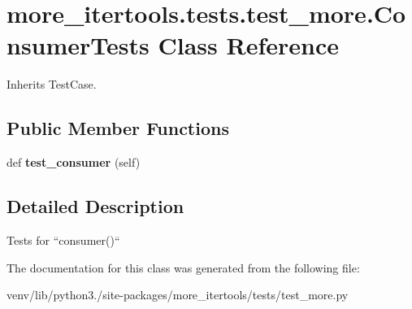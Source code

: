 \hypertarget{classmore__itertools_1_1tests_1_1test__more_1_1_consumer_tests}{}\section{more\+\_\+itertools.\+tests.\+test\+\_\+more.\+Consumer\+Tests Class Reference}
\label{classmore__itertools_1_1tests_1_1test__more_1_1_consumer_tests}


Inherits Test\+Case.

\subsection*{Public Member Functions}
\begin{DoxyCompactItemize}
\item 
\mbox{\label{classmore__itertools_1_1tests_1_1test__more_1_1_consumer_tests_a8c184f40754d63bd7e470deb3bcdfda5}} 
def {\bfseries test\+\_\+consumer} (self)
\end{DoxyCompactItemize}


\subsection{Detailed Description}
\begin{DoxyVerb}Tests for ``consumer()``\end{DoxyVerb}
 

The documentation for this class was generated from the following file\+:\begin{DoxyCompactItemize}
\item 
venv/lib/python3./site-\/packages/more\+\_\+itertools/tests/test\+\_\+more.\+py\end{DoxyCompactItemize}

